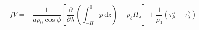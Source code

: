 \begin{equation}
-fV = -\frac{1}{a\rho_0\cos\phi}\left[\frac{\partial}{\partial \lambda}\left(\int_{-H}^0p\,\text{d}z\right)-p_b H_\lambda\right]+\frac{1}{\rho_0}\left(\tau_\lambda^s-\tau_\lambda^b\right)
\label{EQN:VIntU}
\end{equation}
